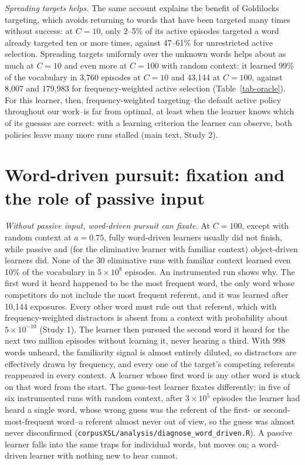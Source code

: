 \documentclass[11pt]{article}
\begin{document}
\textit{Spreading targets helps.} The same account explains the benefit of Goldilocks targeting, which avoids returning to words that have been targeted many times without success: at $C=10$, only 2--5\% of its active episodes targeted a word already targeted ten or more times, against 47--61\% for unrestricted active selection. Spreading targets uniformly over the unknown words helps about as much at $C=10$ and even more at $C=100$ with random context: it learned 99\% of the vocabulary in 3,760 episodes at $C=10$ and 43,144 at $C=100$, against 8,007 and 179,983 for frequency-weighted active selection (Table~\ref{tab-oracle}). For this learner, then, frequency-weighted targeting--the default active policy throughout our work--is far from optimal, at least when the learner knows which of its guesses are correct: with a learning criterion the learner can observe, both policies leave many more runs stalled (main text, Study 2).

\section{Word-driven pursuit: fixation and the role of passive input}
\label{sec-wd}
\textit{Without passive input, word-driven pursuit can fixate.} At $C=100$, except with random context at $a=0.75$, fully word-driven learners usually did not finish, while passive and (for the eliminative learner with familiar context) object-driven learners did. None of the 30 eliminative runs with familiar context learned even 10\% of the vocabulary in $5 \times 10^8$ episodes. An instrumented run shows why. The first word it heard happened to be the most frequent word, the only word whose competitors do not include the most frequent referent, and it was learned after 10,144 exposures. Every other word must rule out that referent, which with frequency-weighted distractors is absent from a context with probability about $5 \times 10^{-10}$ (Study 1). The learner then pursued the second word it heard for the next two million episodes without learning it, never hearing a third. With 998 words unheard, the familiarity signal is almost entirely diluted, so distractors are effectively drawn by frequency, and every one of the target's competing referents reappeared in every context. A learner whose first word is any other word is stuck on that word from the start. The guess-test learner fixates differently: in five of six instrumented runs with random context, after $3 \times 10^5$ episodes the learner had heard a single word, whose wrong guess was the referent of the first- or second-most-frequent word--a referent almost never out of view, so the guess was almost never disconfirmed (\texttt{corpusXSL/analysis/diagnose\_word\_driven.R}). A passive learner falls into the same traps for individual words, but moves on; a word-driven learner with nothing new to hear cannot.
\end{document}
